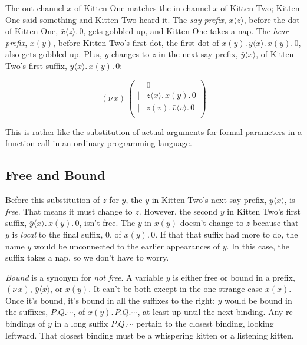 \documentclass[10pt,oneside,x11names]{article}
\newcommand\napping    [0]{0}
\newcommand\chatting   [3]{\bar{#1}\langle{#2}\rangle{}.\,#3}
\newcommand\listening  [3]{#1(#2).\,#3}
\newcommand\whispering [2]{(\nu\,#1)\,{#2}}
\newcommand{\kitOne}{\chatting{x}{z}{\napping}}
\newcommand{\kitTwo}{\listening{x}{y}{\chatting{y}{x}{\listening{x}{y}{\napping}}}}
\newcommand{\kitTwoSuffixx}{\chatting{y}{x}{\listening{x}{y}{\napping}}}
\newcommand{\kitTwoHearSuffix}{\listening{x}{y}{\napping}}
\theoremstyle{definition}
\theoremstyle{warning}
\begin{document}
The out-channel \(\bar{x}\) of Kitten One matches the in-channel \(x\)
of Kitten Two; Kitten One said something and Kitten Two heard it.
The \emph{say-prefix}, \(\bar{x}\langle{}z\rangle\), before the dot of
Kitten One, \(\kitOne\), gets gobbled up, and Kitten One takes a
nap. The \emph{hear-prefix}, \(x(y)\), before Kitten Two's first dot, the
first dot of \(\kitTwo\), also gets gobbled up. Plus, \(y\) changes to
\(z\) in the next say-prefix, \(\bar{y}\langle{x}\rangle\), of Kitten
Two's first suffix, \(\kitTwoSuffixx\):

\begin{equation}
\whispering{x}{\left(
\begin{array}{clll}
 {}     & \napping  \\
 \vert  & \chatting{z}{x}{\listening{x}{y}{\napping}} \\
 \vert  & \listening{z}{v}{\chatting{v}{v}{\napping}} \\
\end{array}\right)}
\end{equation}

This is rather like the substitution of actual arguments for
formal parameters in a function call in an ordinary programming
language.

\subsection{Free and Bound}
\label{sec:org0d3abe5}

Before this substitution of \(z\) for \(y\), the \(y\) in Kitten Two's
next say-prefix, \(\bar{y}\langle{x}\rangle\), is \emph{free}. That means
it must change to \(z\). However, the second \(y\) in Kitten Two's
first suffix, \(\kitTwoSuffixx\), isn't free. The \(y\) in \(x(y)\)
doesn't change to \(z\) because that \(y\) is \emph{local} to the final
suffix, \(0\), of \(\kitTwoHearSuffix\). If that that suffix had more
to do, the name \(y\) would be unconnected to the earlier
appearances of \(y\). In this case, the suffix takes a nap, so we
don't have to worry.

\emph{Bound} is a synonym for \emph{not free}. A variable \(y\) is either free
or bound in a prefix, \((\nu\,x)\), \(\bar{y}\langle{x}\rangle\), or
\(x(y)\). It can't be both except in the one strange case \(x(x)\).
Once it's bound, it's bound in all the suffixes to the right; \(y\)
would be bound in the suffixes, \(P.Q.\cdots\), of
\(\listening{x}{y}{P.Q.\cdots}\), at least up until the next
binding. Any re-bindings of \(y\) in a long suffix \(P.Q.\cdots\)
pertain to the closest binding, looking leftward. That closest
binding must be a whispering kitten or a listening kitten.
\end{document}

